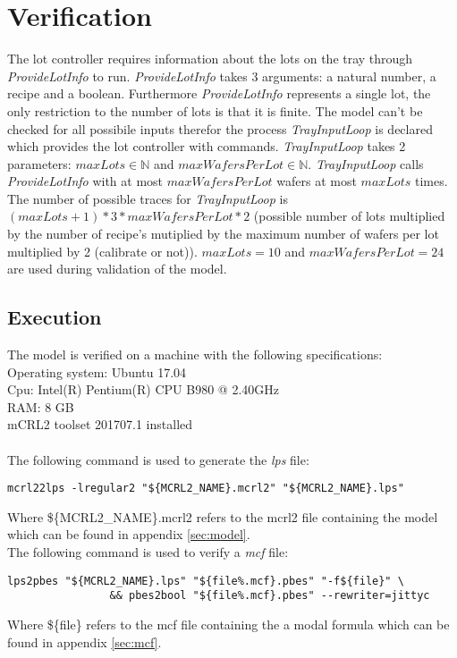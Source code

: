 \section{Verification}\label{sec:results}
The lot controller requires information about the lots on the tray through \textit{ProvideLotInfo} to run. \textit{ProvideLotInfo} takes 3 arguments: a natural number, a recipe and a boolean. Furthermore \textit{ProvideLotInfo} represents a single lot, the only restriction to the number of lots is that it is finite. The model can't be checked for all possibile inputs therefor the process \textit{TrayInputLoop} is declared which provides the lot controller with  commands. \textit{TrayInputLoop} takes 2 parameters: $\mathit{maxLots} \in \mathbb{N}$ and $\mathit{maxWafersPerLot} \in \mathbb{N}$. \textit{TrayInputLoop} calls \textit{ProvideLotInfo} with at most $\mathit{maxWafersPerLot}$ wafers at most $\mathit{maxLots}$ times. The number of possible traces for \textit{TrayInputLoop} is $(\mathit{maxLots}+1) * 3 * \mathit{maxWafersPerLot} * 2$ (possible number of lots multiplied by the number of recipe's mutiplied by the maximum number of wafers per lot multiplied by 2 (calibrate or not)). $\mathit{maxLots} = 10$ and $\mathit{maxWafersPerLot} = 24$ are used during validation of the model.
\subsection{Execution}
The model is verified on a machine with the following specifications:\\
Operating system: Ubuntu 17.04\\
Cpu: Intel(R) Pentium(R) CPU B980 @ 2.40GHz\\
RAM: 8 GB\\
mCRL2 toolset 201707.1 installed\\
\\
The following command is used to generate the \textit{lps} file:\\
\begin{lstlisting}[frame=single,caption={mcf2lps}]
mcrl22lps -lregular2 "${MCRL2_NAME}.mcrl2" "${MCRL2_NAME}.lps"
\end{lstlisting}
Where \$\{MCRL2\_NAME\}.mcrl2 refers to the mcrl2 file containing the model which can be found in appendix \ref{sec:model}.\\
The following command is used to verify a \textit{mcf} file:\\
\begin{lstlisting}[frame=single,caption={mcf check}] 
lps2pbes "${MCRL2_NAME}.lps" "${file%.mcf}.pbes" "-f${file}" \
                && pbes2bool "${file%.mcf}.pbes" --rewriter=jittyc
\end{lstlisting}
Where \$\{file\} refers to the mcf file containing the a modal formula which can be found in appendix \ref{sec:mcf}.\\
